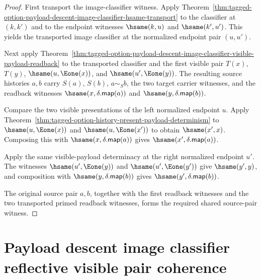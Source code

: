 \begin{proof}
First transport the image-classifier witness. Apply
Theorem~\ref{thm:tagged-option-payload-descent-image-classifier-hsame-transport}
to the classifier at $(k,k')$ and to the endpoint witnesses $\hsame(k,u)$ and
$\hsame(k',u')$. This yields the transported image classifier at the normalized
endpoint pair $(u,u')$.

Next apply
Theorem~\ref{thm:tagged-option-payload-descent-image-classifier-visible-payload-readback}
to the transported classifier and the first visible pair
$T(x)$, $T(y)$, $\hsame(u,\Eone(x))$, and $\hsame(u',\Eone(y))$. The resulting
source histories $a,b$ carry $S(a)$, $S(b)$, $a\sim_S b$, the two target carrier
witnesses, and the readback witnesses $\hsame(x,\delta.\mathsf{map}(a))$ and
$\hsame(y,\delta.\mathsf{map}(b))$.

Compare the two visible presentations of the left normalized endpoint $u$.
Apply
Theorem~\ref{thm:tagged-option-history-present-payload-determinism}
to $\hsame(u,\Eone(x))$ and $\hsame(u,\Eone(x'))$ to obtain $\hsame(x',x)$.
Composing this with $\hsame(x,\delta.\mathsf{map}(a))$ gives
$\hsame(x',\delta.\mathsf{map}(a))$.

Apply the same visible-payload determinacy at the right normalized endpoint
$u'$. The witnesses $\hsame(u',\Eone(y))$ and $\hsame(u',\Eone(y'))$ give
$\hsame(y',y)$, and composition with $\hsame(y,\delta.\mathsf{map}(b))$ gives
$\hsame(y',\delta.\mathsf{map}(b))$.

The original source pair $a,b$, together with the first readback witnesses and
the two transported primed readback witnesses, forms the required shared
source-pair witness.
\end{proof}

\section{Payload descent image classifier reflective visible pair coherence}
\label{sec:option-payload-descent-image-reflective-visible-pair-coherence}

